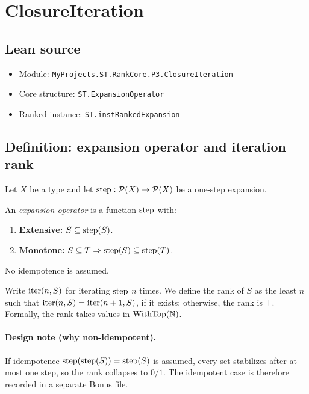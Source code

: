 \section{ClosureIteration}
\label{sec:ex-closureiteration}

\subsection{Lean source}
\begin{itemize}
\item Module: \texttt{MyProjects.ST.RankCore.P3.ClosureIteration}
\item Core structure: \texttt{ST.ExpansionOperator}
\item Ranked instance: \texttt{ST.instRankedExpansion}
\end{itemize}

\subsection{Definition: expansion operator and iteration rank}
Let $X$ be a type and let $\operatorname{step} : \mathcal{P}(X)\to \mathcal{P}(X)$ be a one-step expansion.
\begin{definition}
An \emph{expansion operator} is a function $\operatorname{step}$ with:
\begin{enumerate}
\item \textbf{Extensive:} $S \subseteq \operatorname{step}(S)$.
\item \textbf{Monotone:} $S \subseteq T \Rightarrow \operatorname{step}(S) \subseteq \operatorname{step}(T)$.
\end{enumerate}
No idempotence is assumed.
\end{definition}

\begin{definition}
Write $\operatorname{iter}(n,S)$ for iterating $\operatorname{step}$ $n$ times.
We define the rank of $S$ as the least $n$ such that $\operatorname{iter}(n,S)=\operatorname{iter}(n+1,S)$, if it exists;
otherwise, the rank is $\top$.
Formally, the rank takes values in $\operatorname{WithTop}(\mathbb{N})$.
\end{definition}

\paragraph{Design note (why non-idempotent).}
If idempotence $\operatorname{step}(\operatorname{step}(S))=\operatorname{step}(S)$ is assumed, every set stabilizes after at most one step,
so the rank collapses to $0/1$. The idempotent case is therefore recorded in a separate Bonus file.

